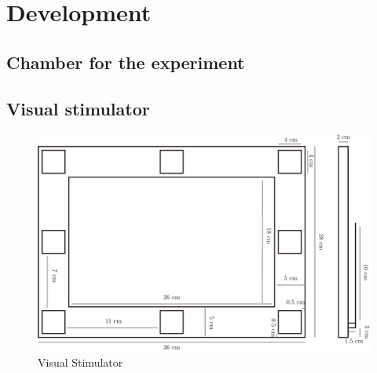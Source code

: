 \chapter{Development}

\label{ch:Development}

\setlength{\parindent}{4em}
\setlength{\parskip}{1em}
\renewcommand{\baselinestretch}{1.5}

\section{Chamber for the experiment}

\section{Visual stimulator}

\begin{figure}[ht]
	\centering
	\includegraphics[width=\textwidth]{chapter6/symatric.pdf}
	\caption{Visual Stimulator}
\end{figure}